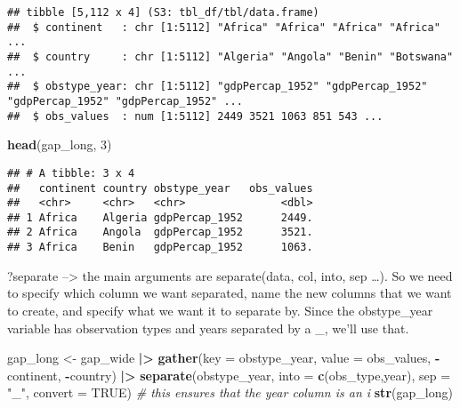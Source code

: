 \documentclass[
]{article}
\newenvironment{Shaded}{\begin{snugshade}}{\end{snugshade}}
\newcommand{\AttributeTok}[1]{\textcolor[rgb]{0.13,0.29,0.53}{#1}}
\newcommand{\CommentTok}[1]{\textcolor[rgb]{0.56,0.35,0.01}{\textit{#1}}}
\newcommand{\ConstantTok}[1]{\textcolor[rgb]{0.56,0.35,0.01}{#1}}
\newcommand{\DecValTok}[1]{\textcolor[rgb]{0.00,0.00,0.81}{#1}}
\newcommand{\FunctionTok}[1]{\textcolor[rgb]{0.13,0.29,0.53}{\textbf{#1}}}
\newcommand{\NormalTok}[1]{#1}
\newcommand{\OtherTok}[1]{\textcolor[rgb]{0.56,0.35,0.01}{#1}}
\newcommand{\SpecialCharTok}[1]{\textcolor[rgb]{0.81,0.36,0.00}{\textbf{#1}}}
\newcommand{\StringTok}[1]{\textcolor[rgb]{0.31,0.60,0.02}{#1}}
\begin{document}
\begin{verbatim}
## tibble [5,112 x 4] (S3: tbl_df/tbl/data.frame)
##  $ continent   : chr [1:5112] "Africa" "Africa" "Africa" "Africa" ...
##  $ country     : chr [1:5112] "Algeria" "Angola" "Benin" "Botswana" ...
##  $ obstype_year: chr [1:5112] "gdpPercap_1952" "gdpPercap_1952" "gdpPercap_1952" "gdpPercap_1952" ...
##  $ obs_values  : num [1:5112] 2449 3521 1063 851 543 ...
\end{verbatim}

\begin{Shaded}
\begin{Highlighting}[]
\FunctionTok{head}\NormalTok{(gap\_long, }\DecValTok{3}\NormalTok{)}
\end{Highlighting}
\end{Shaded}

\begin{verbatim}
## # A tibble: 3 x 4
##   continent country obstype_year   obs_values
##   <chr>     <chr>   <chr>               <dbl>
## 1 Africa    Algeria gdpPercap_1952      2449.
## 2 Africa    Angola  gdpPercap_1952      3521.
## 3 Africa    Benin   gdpPercap_1952      1063.
\end{verbatim}

?separate --\textgreater{} the main arguments are separate(data, col,
into, sep \ldots). So we need to specify which column we want separated,
name the new columns that we want to create, and specify what we want it
to separate by. Since the obstype\_year variable has observation types
and years separated by a \_, we'll use that.

\begin{Shaded}
\begin{Highlighting}[]
\NormalTok{gap\_long }\OtherTok{\textless{}{-}}\NormalTok{ gap\_wide }\SpecialCharTok{|\textgreater{}}
  \FunctionTok{gather}\NormalTok{(}\AttributeTok{key =}\NormalTok{ obstype\_year,}
         \AttributeTok{value =}\NormalTok{ obs\_values,}
         \SpecialCharTok{{-}}\NormalTok{continent, }\SpecialCharTok{{-}}\NormalTok{country) }\SpecialCharTok{|\textgreater{}}
  \FunctionTok{separate}\NormalTok{(obstype\_year,}
           \AttributeTok{into =} \FunctionTok{c}\NormalTok{(}\StringTok{\textquotesingle{}obs\_type\textquotesingle{}}\NormalTok{,}\StringTok{\textquotesingle{}year\textquotesingle{}}\NormalTok{),}
           \AttributeTok{sep =} \StringTok{"\_"}\NormalTok{,}
          \AttributeTok{convert =} \ConstantTok{TRUE}\NormalTok{) }\CommentTok{\# this ensures that the year column is an i}
\FunctionTok{str}\NormalTok{(gap\_long)}
\end{Highlighting}
\end{Shaded}
\end{document}
